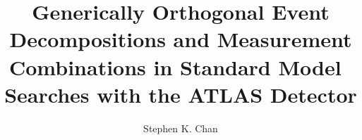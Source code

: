 \title{Generically Orthogonal Event Decompositions and Measurement Combinations in Standard Model \vhbb\, Searches with the ATLAS Detector}
\author{Stephen K. Chan}





\degreemonth{}


